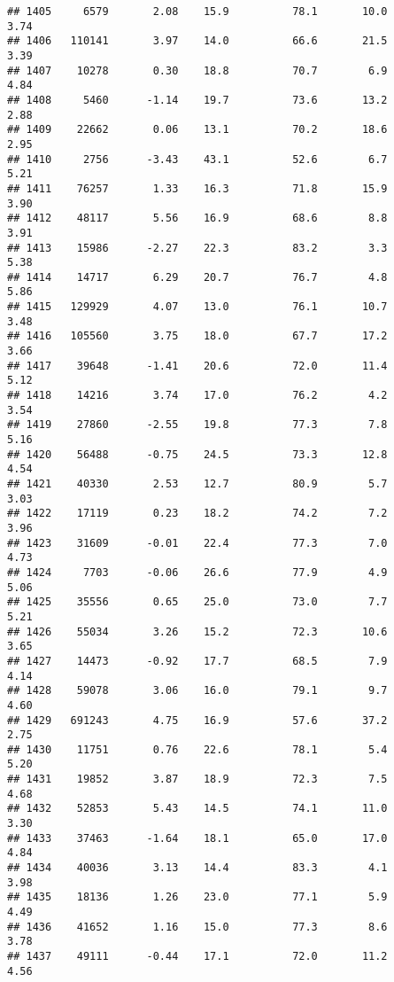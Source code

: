 \documentclass[
]{article}
\begin{document}
\begin{verbatim}
## 1405     6579       2.08    15.9          78.1       10.0              3.74
## 1406   110141       3.97    14.0          66.6       21.5              3.39
## 1407    10278       0.30    18.8          70.7        6.9              4.84
## 1408     5460      -1.14    19.7          73.6       13.2              2.88
## 1409    22662       0.06    13.1          70.2       18.6              2.95
## 1410     2756      -3.43    43.1          52.6        6.7              5.21
## 1411    76257       1.33    16.3          71.8       15.9              3.90
## 1412    48117       5.56    16.9          68.6        8.8              3.91
## 1413    15986      -2.27    22.3          83.2        3.3              5.38
## 1414    14717       6.29    20.7          76.7        4.8              5.86
## 1415   129929       4.07    13.0          76.1       10.7              3.48
## 1416   105560       3.75    18.0          67.7       17.2              3.66
## 1417    39648      -1.41    20.6          72.0       11.4              5.12
## 1418    14216       3.74    17.0          76.2        4.2              3.54
## 1419    27860      -2.55    19.8          77.3        7.8              5.16
## 1420    56488      -0.75    24.5          73.3       12.8              4.54
## 1421    40330       2.53    12.7          80.9        5.7              3.03
## 1422    17119       0.23    18.2          74.2        7.2              3.96
## 1423    31609      -0.01    22.4          77.3        7.0              4.73
## 1424     7703      -0.06    26.6          77.9        4.9              5.06
## 1425    35556       0.65    25.0          73.0        7.7              5.21
## 1426    55034       3.26    15.2          72.3       10.6              3.65
## 1427    14473      -0.92    17.7          68.5        7.9              4.14
## 1428    59078       3.06    16.0          79.1        9.7              4.60
## 1429   691243       4.75    16.9          57.6       37.2              2.75
## 1430    11751       0.76    22.6          78.1        5.4              5.20
## 1431    19852       3.87    18.9          72.3        7.5              4.68
## 1432    52853       5.43    14.5          74.1       11.0              3.30
## 1433    37463      -1.64    18.1          65.0       17.0              4.84
## 1434    40036       3.13    14.4          83.3        4.1              3.98
## 1435    18136       1.26    23.0          77.1        5.9              4.49
## 1436    41652       1.16    15.0          77.3        8.6              3.78
## 1437    49111      -0.44    17.1          72.0       11.2              4.56

\end{verbatim}
\end{document}

